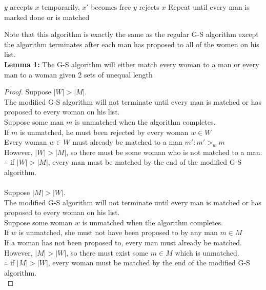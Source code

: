 \begin{problem}
\begin{algorithmic}[1]
        \STATE $y$ accepts $x$ temporarily, $x'$ becomes free
        \ELSE
        \STATE $y$ rejects $x$
        \ENDIF
      \ENDIF
      \STATE Repeat until every man is marked done or is matched
    \end{algorithmic}
    \noindent
    Note that this algorithm is exactly the same as the regular G-S algorithm except the algorithm terminates after each man has proposed to
    all of the women on his list. \\
    \textbf{Lemma 1:} The G-S algorithm will either match every woman to a man or every man to a woman given 2 sets of unequal length
    \begin{proof}
      Suppose $|W| > |M|$. \\
      The modified G-S algorithm will not terminate until every man is matched or has proposed to every woman on his list. \\
      Suppose some man $m$ is unmatched when the algorithm completes. \\
      If $m$ is unmatched, he must been rejected by every woman $w \in W$ \\
      Every woman $w \in W$ must already be matched to a man $m': m' >_{w} m$ \\
      However, $|W| > |M|$, so there must be some woman who is not matched to a man. \\
      $\therefore$ if $|W| > |M|$, every man must be matched by the end of the modified G-S algorithm. \\\\
      Suppose $|M| > |W|$. \\
      The modified G-S algorithm will not terminate until every man is matched or has proposed to every woman on his list. \\
      Suppose some woman $w$ is unmatched when the algorithm completes. \\
      If $w$ is unmatched, she must not have been proposed to by any man $m \in M$ \\
      If a woman has not been proposed to, every man must already be matched. \\
      However, $|M| > |W|$, so there must exist some $m \in M$ which is unmatched. \\
      $\therefore$ if $|M| > |W|$, every woman must be matched by the end of the modified G-S algorithm. \\
    \end{proof}

\end{problem}
